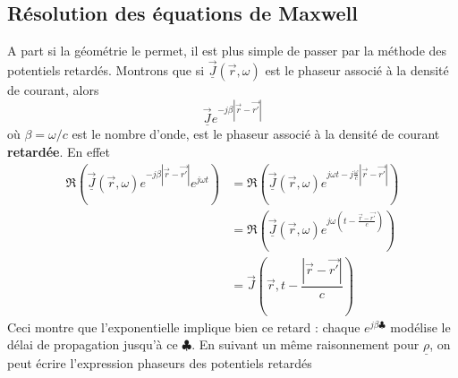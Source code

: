 	\subsection{Résolution des équations de Maxwell}
	A part si la géométrie le permet, il est plus simple de passer par la méthode des potentiels 
	retardés. Montrons que si $\underline{\vec{J}}(\vec{r},\omega)$ est le phaseur associé à la 
	densité de courant, alors
	\begin{equation}
	\underline{\vec{J}}e^{-j\beta|\vec{r}-\vec{r'}|}
	\end{equation}
	où $\beta = \omega/c$ est le nombre d'onde, est le phaseur associé à la densité de courant 
	\textbf{retardée}. En effet
	\begin{equation}
	\begin{array}{ll}
	\Re\left(\underline{\vec{J}}(\vec{r},\omega)e^{-j\beta|\vec{r}-\vec{r'}|}e^{j\omega t}\right) &=
	\Re\left(\underline{\vec{J}}(\vec{r},\omega)e^{j\omega t - j\frac{\omega}{c}	|\vec{r}-\vec{r'}|}
	\right)	 \\
	&=\Re \left(\underline{\vec{J}}(\vec{r},\omega)e^{j\omega\left(t-\frac{\vec{r}-\vec{r'}}{c}\right)}
	\right)\\
	&= \vec{J}\left(\vec{r},t-\dfrac{|\vec{r}-\vec{r'}|}{c}\right)
	\end{array}
	\end{equation}
	Ceci montre que l'exponentielle implique bien ce retard : chaque $e^{j\beta\clubsuit}$ modélise 
	le délai de propagation jusqu'à ce $\clubsuit$. En suivant un même raisonnement pour $\underline{
	\rho}$,  on peut écrire l'expression phaseurs des potentiels retardés\\
	

